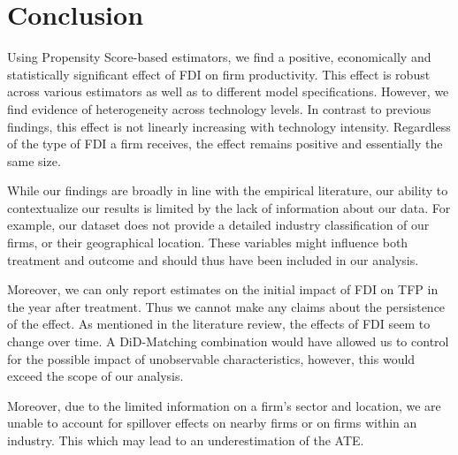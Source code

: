 \documentclass[a4paper,11pt]{scrartcl}
\begin{document}
\section{Conclusion}

Using Propensity Score-based estimators, we find a positive, economically and statistically significant effect of FDI on firm productivity. This effect is robust across various estimators as well as to different model specifications. However, we find evidence of heterogeneity across technology levels. In contrast to previous findings, this effect is not linearly increasing with technology intensity. Regardless of the type of FDI a firm receives, the effect remains positive and essentially the same size.

While our findings are broadly in line with the empirical literature, our ability to contextualize our results is limited by the lack of information about our data. For example, our dataset does not provide a detailed industry classification of our firms, or their geographical location. These variables might influence both treatment and outcome and should thus have been included in our analysis. 


Moreover, we can only report estimates on the initial impact of FDI on TFP in the year after treatment. Thus we cannot make any claims about the persistence of the effect.%
 As mentioned in the literature review, the effects of FDI seem to change over time. %
 A DiD-Matching combination would have allowed us to control for the possible impact of unobservable characteristics, however, this would exceed the scope of our analysis. 

 Moreover, due to the limited information on a firm's sector and location, we are unable to account for spillover effects on nearby firms or on firms within an industry. This which may lead to an underestimation of the ATE. 


\newpage

 
\newpage
\end{document}
